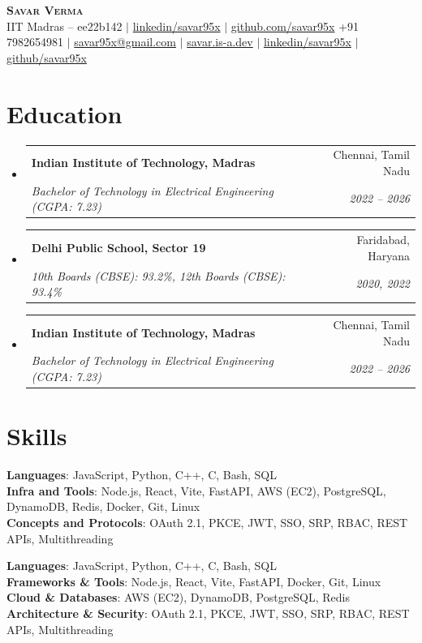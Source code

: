 \documentclass[letterpaper,11pt]{article}
\makeatletter
\newcommand{\resumeSubheadingCollege}[4]{
  \vspace{-2pt}\item
    \begin{tabular*}{0.97\textwidth}[t]{l@{\extracolsep{\fill}}r}
      \textbf{#1} & #2 \\
      \textit{\small#3} & \textit{\small #4} \\
    \end{tabular*}\vspace{-7pt}
}
\newcommand{\resumeSubheadingSchool}[4]{
  \vspace{-2pt}\item
    \begin{tabular*}{0.97\textwidth}[t]{l@{\extracolsep{\fill}}r}
      \textbf{#1} & #2 \\
      \textit{\small#3} & \textit{\small #4} \\
    \end{tabular*}\vspace{-7pt}
}
\newcommand{\resumeSubHeadingListStart}{\begin{itemize}[leftmargin=0.15in, label={}]}
\newcommand{\resumeSubHeadingListEnd}{\end{itemize}}
\makeatother
\begin{document}
\begin{center}
    \textbf{\Huge \scshape Savar Verma} \\ \vspace{1pt}
\ifcampus
    {IIT Madras -- ee22b142} $|$
    \href{https://linkedin.com/in/savar95x}{{linkedin/savar95x}} $|$
    \href{https://github.com/savar95x}{{github.com/savar95x}}
\else
    \small +91 7982654981 $|$ \href{mailto:savar95x@gmail.com}{{savar95x@gmail.com}} $|$
    \href{https://savar.is-a.dev}{{savar.is-a.dev}} $|$
    \href{https://linkedin.com/in/savar95x}{{linkedin/savar95x}} $|$
    \href{https://github.com/savar95x}{{github/savar95x}}
\fi
\end{center}

\section{Education}
  \resumeSubHeadingListStart
\ifcampus
    \resumeSubheadingCollege
      {Indian Institute of Technology, Madras}{Chennai, Tamil Nadu}
      {Bachelor of Technology in Electrical Engineering (CGPA: 7.23)}{2022 -- 2026}
    \resumeSubheadingSchool
      {Delhi Public School, Sector 19}{Faridabad, Haryana}
      {10th Boards (CBSE): 93.2\%, 12th Boards (CBSE): 93.4\%}{2020, 2022}
\else
    \resumeSubheadingCollege
      {Indian Institute of Technology, Madras}{Chennai, Tamil Nadu}
      {Bachelor of Technology in Electrical Engineering (CGPA: 7.23)}{2022 -- 2026}
\fi
  \resumeSubHeadingListEnd

\section{Skills}
 \begin{itemize}[leftmargin=0.15in, label={}]
    \ifcampus
        \small{\item{
        \textbf{Languages}{: JavaScript, Python, C++, C, Bash, SQL} \\
        \textbf{Infra and Tools}{: Node.js, React, Vite, FastAPI, AWS (EC2), PostgreSQL, DynamoDB, Redis, Docker, Git, Linux} \\
        \textbf{Concepts and Protocols}{: OAuth 2.1, PKCE, JWT, SSO, SRP, RBAC, REST APIs, Multithreading} \\
        }}
    \else
        \small{\item{
        \textbf{Languages}{: JavaScript, Python, C++, C, Bash, SQL} \\
        \textbf{Frameworks \& Tools}{: Node.js, React, Vite, FastAPI, Docker, Git, Linux} \\
        \textbf{Cloud \& Databases}{: AWS (EC2), DynamoDB, PostgreSQL, Redis} \\
        \textbf{Architecture \& Security}{: OAuth 2.1, PKCE, JWT, SSO, SRP, RBAC, REST APIs, Multithreading} \\
        }}
    \fi
 \end{itemize}
\end{document}
